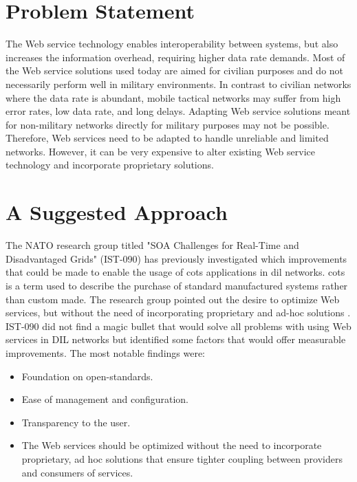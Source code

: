 \section{Problem Statement}
\label{section:problem-statement}

The Web service technology enables interoperability between systems, but also
increases the information overhead, requiring higher data rate demands. Most of
the Web service solutions used today are aimed for civilian purposes and do not
necessarily perform well in military environments. In contrast to civilian
networks where the data rate is abundant, mobile tactical networks may suffer
from high error rates, low data rate, and long delays. Adapting Web service
solutions meant for non-military networks directly for military purposes may not
be possible. Therefore, Web services need to be adapted to handle unreliable and
limited networks. However, it can be very expensive to alter existing Web
service technology and incorporate proprietary solutions.


\section{A Suggested Approach}
\label{section:hypothesis}

The NATO research group titled "SOA Challenges for Real-Time and Disadvantaged
Grids" (IST-090) has previously investigated which improvements that could be
made to enable the usage of \gls{cots} applications in \gls{dil} networks.
\Gls{cots} is a term used to describe the purchase of standard manufactured
systems rather than custom made. The research group pointed out the desire to
optimize Web services, but without the need of incorporating proprietary and
ad-hoc solutions \cite{ist-090}. IST-090 did not find a magic bullet that would
solve all problems with using Web services in DIL networks but identified some
factors that would offer measurable improvements. The most notable findings
were:

\begin{itemize}

    \item Foundation on open-standards.

    \item Ease of management and configuration.

    \item Transparency to the user.

    \item The Web services should be optimized without the need to incorporate
    proprietary, ad hoc solutions that ensure tighter coupling between providers
    and consumers of services.

\end{itemize}

